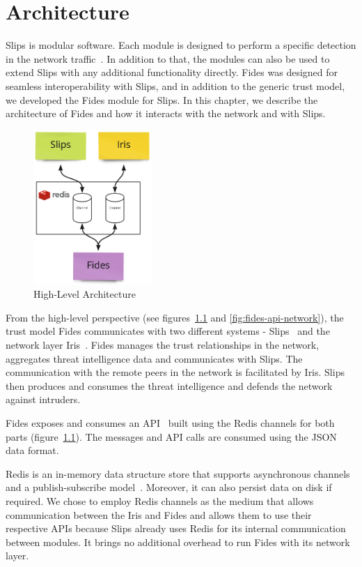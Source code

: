 \chapter{Architecture}
\label{ch:architecture}
Slips is modular software. Each module is designed to perform a specific detection in the network traffic~\cite{slips}.
In addition to that, the modules can also be used to extend Slips with any additional functionality directly. 
Fides was designed for seamless interoperability with Slips, and in addition to the generic trust model, we developed the Fides module for Slips.
In this chapter, we describe the architecture of Fides and how it interacts with the network and with Slips.

\begin{figure}[ht]
    \centering
    \includegraphics[width=0.4\textwidth]{assets/redis_channels.jpeg}
    \caption{High-Level Architecture}
    \label{fig:high-level-architecture}
\end{figure}

From the high-level perspective (see figures~\ref{fig:high-level-architecture} and \ref{fig:fides-api-network}), the trust model Fides  communicates with two different systems - Slips~\cite{slips} and the network layer Iris~\cite{nl}.
Fides manages the trust relationships in the network, aggregates threat intelligence data and communicates with Slips. The communication with the remote peers in the network is facilitated by Iris. 
Slips then produces and consumes the threat intelligence and defends the network against intruders.

Fides exposes and consumes an API~\cite{api} built using the Redis channels for both parts (figure~\ref{fig:high-level-architecture}).
The messages and API calls are consumed using the JSON~\cite{json} data format.

Redis is an in-memory data structure store that supports asynchronous channels and a publish-subscribe model~\cite{redis}. Moreover, it can also persist data on disk if required.
We chose to employ Redis channels as the medium that allows communication between the Iris and Fides and allows them to use their respective APIs because Slips already uses Redis for its internal communication between modules. It brings no additional overhead to run Fides with its network layer.



